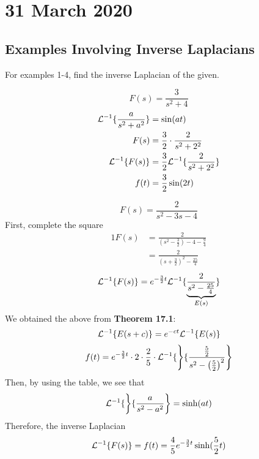 \documentclass[diffeq.tex]{subfiles}
\begin{document}
\chapter{31 March 2020}
    \section{Examples Involving Inverse Laplacians}
    For examples 1-4, find the inverse Laplacian of the given.
    \begin{example}
        \begin{equation}
            F(s) = \frac{3}{s^{2} + 4}
        \end{equation}
        \begin{alignat}{1}
            \mathcal{L}^{-1}\{\frac{a}{s^{2} + a^{2}}\} &= \sin(at)\\
            F(s) &= \frac{3}{2} \cdot \frac{2}{s^{2} + 2^{2}}\\
            \mathcal{L}^{-1}\{F(s)\} &= \frac{3}{2}\mathcal{L}^{-1}\{\frac{2}{s^{2} + 2^{2}}\}\\
            f(t) &= \frac{3}{2}\sin(2t)
        \end{alignat}
    \end{example}
    \begin{example}
        \begin{equation}
            F(s) = \frac{2}{s^{2} - 3s - 4}
        \end{equation}
        First, complete the square
        \begin{alignat}{1}
            F(s) &= \frac{2}{\left(s^{2} - \frac{3}{2}\right) - 4 - \frac{9}{4}}\\
            &= \frac{2}{\left(s + \frac{3}{2}\right)^{2} - \frac{25}{4}}
        \end{alignat}
        \begin{equation}
            \mathcal{L}^{-1}\{F(s)\} = e^{-\frac{3}{2}t}\mathcal{L}^{-1}\{\underbrace{\frac{2}{s^{2} - \frac{25}{4}}}_{E(s)}\}
        \end{equation}
        We obtained the above from \textbf{Theorem 17.1}:
        \begin{equation}
            \mathcal{L}^{-1}\{E(s + c)\} = e^{-ct}\mathcal{L}^{-1}\{E(s)\}
        \end{equation}
        \begin{alignat}{1}
            f(t) = e^{-\frac{3}{2}t}\cdot 2\cdot \frac{2}{5}\cdot \mathcal{L}^{-1}\{\left\}\{\frac{\frac{5}{2}}{s^{2} - \left(\frac{5}{2}\right)^{2}}\right\}
        \end{alignat}
        Then, by using the table, we see that
        \begin{equation}
            \mathcal{L}^{-1}\{\left\}\{\frac{a}{s^{2} - a^{2}}\right\} = \sinh(at)
        \end{equation}
        Therefore, the inverse Laplacian
        \begin{equation}
            \mathcal{L}^{-1}\{F(s)\} = f(t) = \frac{4}{5}e^{-\frac{3}{2}t}\sinh(\frac{5}{2}t)
        \end{equation}
    \end{example}
\end{document}
